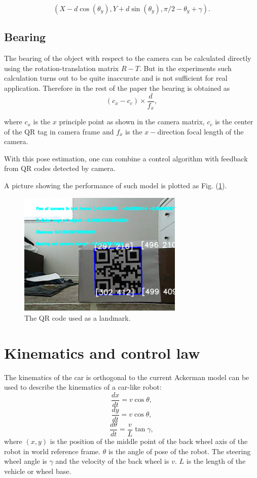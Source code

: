 \documentclass[12pt]{article}
\begin{document}
$$(X-d\cos(\theta_y),Y+d\sin(\theta_y),\pi/2-\theta_y+\gamma).$$
\subsection{Bearing}
The bearing of the object with respect to the camera can be calculated directly using the rotation-translation matrix $R-T$. But in the experiments such calculation turns out to be quite inaccurate and is not sufficient for real application. Therefore in the rest of the paper the bearing is obtained as $$(c_x-c_c)\times \frac{d}{f_x},$$

where $c_x$ is the $x$ principle point as shown in the camera matrix, $c_c$ is the center of the QR tag in camera frame and $f_x$ is the $x-$direction focal length of the camera.

With this pose estimation, one can combine a control algorithm with feedback from QR codes detected by camera.

A picture showing the performance of such model is plotted as  Fig. (\ref{QR}).
\begin{figure}[htbp]
\centering
\includegraphics[width=0.7\textwidth]{../figures/bearing_distance.png}
\caption{The QR code used as a landmark.}\label{QR}
\end{figure}
\section{Kinematics and control law}
\label{kine}
The kinematics of the car is orthogonal to the current 
Ackerman model can be used to describe the kinematics of a car-like robot: 
$$\frac{d x}{dt}=v\cos \theta,$$
$$\frac{d y}{dt}=v\cos \theta,$$
$$\frac{d \theta}{dt}=\frac{v}{L}\tan \gamma,$$
where $(x,y)$ is the position of the middle point of the back wheel axis of the robot in world reference frame. $\theta$ is the angle of pose of the robot. The steering wheel angle is $\gamma$ and the velocity of the back wheel is $v$. $L$ is the length of the vehicle or wheel base.
\end{document}

